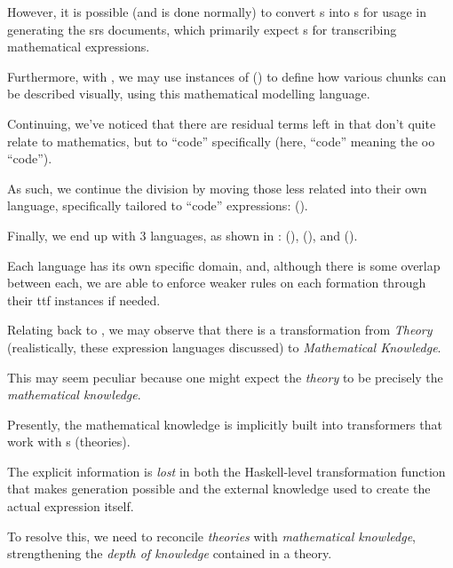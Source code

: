 However, it is possible (and is done normally) to convert \Expr{}s into
\ModelExpr{}s for usage in generating the \acs{srs} documents, which primarily
expect \ModelExpr{}s for transcribing mathematical expressions.

Furthermore, with \ModelExpr{}, we may use instances of \Express{}
() to define how various chunks can be described
visually, using this mathematical modelling language.

\currentExpressHaskell{}

Continuing, we've noticed that there are residual terms left in \Expr{} that
don't quite relate to mathematics, but to ``code'' specifically (here, ``code''
meaning the \acs{oo} ``code'').

As such, we continue the division by moving those less related into their own
language, specifically tailored to ``code'' expressions: \CodeExpr{} ().




Finally, we end up with 3 languages, as shown in : \Expr{}
(), \ModelExpr{} (), and
\CodeExpr{} ().

Each language has its own specific domain, and, although there is some overlap
between each, we are able to enforce weaker rules on each formation through
their \acs{ttf} instances if needed.




Relating back to , we may observe that there is a
transformation from \textit{Theory} (realistically, these expression languages
discussed) to \textit{Mathematical Knowledge}.

This may seem peculiar because one might expect the \textit{theory} to be
precisely the \textit{mathematical knowledge}.

Presently, the mathematical knowledge is implicitly built into transformers that
work with \RelationConcept{}s (theories).

The explicit information is \textit{lost} in both the Haskell-level
transformation function that makes generation possible and the external
knowledge used to create the actual expression itself.

To resolve this, we need to reconcile \textit{theories} with
\textit{mathematical knowledge}, strengthening the \textit{depth of knowledge}
contained in a theory.

